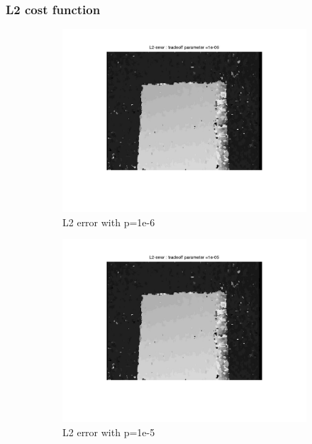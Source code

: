 \documentclass[fleqn]{article}
\begin{document}
\subsubsection{L2 cost function}
\begin{figure}[!ht]
 \begin{subfigure}{0.5\textwidth}
 \centering
\includegraphics[scale=0.2]{./pics/map_L2_error_p=1e-06.jpg}
\caption{L2 error with p=1e-6}
\end{subfigure}
 \begin{subfigure}{0.5\textwidth}
\includegraphics[scale=0.2]{./pics/map_L2_error_p=1e-05.jpg}
\caption{L2 error with p=1e-5}
\end{subfigure}
 \begin{subfigure}{0.5\textwidth}

\end{subfigure}
\end{figure}
\end{document}
